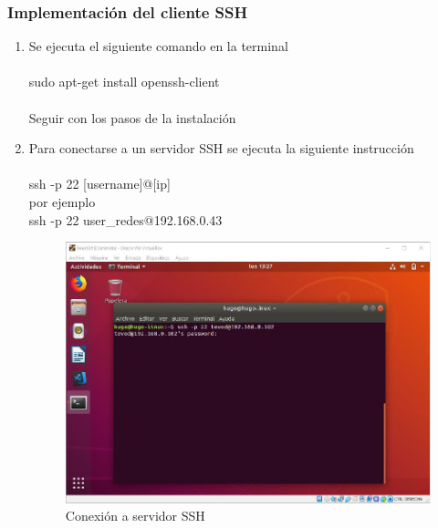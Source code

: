 \subsubsection{Implementación del cliente SSH}
\begin{enumerate}
    \item Se ejecuta el siguiente comando en la terminal\\
    \\sudo apt-get install openssh-client\\
    \\Seguir con los pasos de la instalación
    \item Para conectarse a un servidor SSH se ejecuta la siguiente instrucción\\
    \\ssh -p 22 [username]@[ip]\\
    por ejemplo
    \\ssh -p 22 user{\_}redes@192.168.0.43\\
    \begin{figure}[H]
     \centering
    \includegraphics[scale=.54]{imagenes/primero/4.png}
    \caption{Conexión a servidor SSH}
    \label{fig:http1}
\end{figure}
\end{enumerate}
